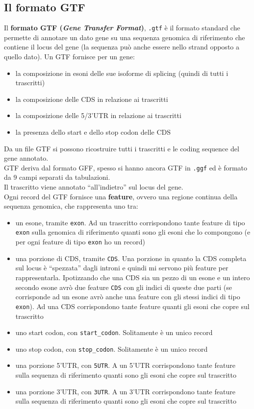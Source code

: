 \documentclass[a4paper,12pt, oneside]{book}
\begin{document}
\subsection{Il formato GTF}
Il \textbf{formato GTF (\textit{Gene Transfer Format})}, \texttt{.gtf} è il
formato standard che permette di 
annotare un dato gene su una sequenza genomica di riferimento che contiene il
locus del gene (la sequenza può anche essere nello strand opposto a quello
dato). Un GTF fornisce per un gene: 
\begin{itemize}
  \item la composizione in esoni delle sue isoforme di splicing (quindi di tutti
  i trascritti)
  \item la composizione delle CDS in relazione ai trascritti
  \item la composizione delle 5/3'UTR in relazione ai trascritti
  \item la presenza dello start e dello stop codon delle CDS
\end{itemize}
Da un file GTF si possono ricostruire tutti i trascritti e le coding sequence
del gene annotato. \\
GTF deriva dal formato GFF, spesso si hanno ancora GTF in \texttt{.ggf} ed è
formato da 9 campi separati da tabulazioni. \\
Il trascritto viene annotato ``all'indietro'' sul locus del gene.\\
Ogni record del GTF fornisce una \textbf{feature}, ovvero una regione continua
della sequenza genomica, che rappresenta uno tra:
\begin{itemize}
  \item un esone, tramite \texttt{exon}. Ad un trascritto corrispondono tante
  feature di tipo \texttt{exon} sulla genomica di riferimento quanti sono gli
  esoni che lo compongono (e per ogni feature di tipo \texttt{exon} ho un
  record) 
  \item una porzione di CDS, tramite \texttt{CDS}. Una porzione in quanto la CDS
  completa sul locus è ``spezzata'' dagli introni e quindi mi servono più
  feature per rappresentarla. Ipotizzando che una CDS sia un pezzo di un esone e
  un intero secondo esone avrò due feature \texttt{CDS} con gli indici di queste
  due parti (se corrisponde ad un esone avrò anche una feature con gli stessi
  indici di tipo \texttt{exon}). Ad una CDS corrispondono tante feature quanti
  gli esoni che copre sul trascritto
  \item uno start codon, con \texttt{start\_codon}. Solitamente è un unico
  record 
  \item uno stop codon, con \texttt{stop\_codon}. Solitamente è un unico record 
  \item una porzione 5'UTR, con \texttt{5UTR}. A un 5'UTR corrispondono tante
  feature sulla sequenza di riferimento quanti sono gli esoni che copre sul
  trascritto 
  \item una porzione 3'UTR, con \texttt{3UTR}. A un 3'UTR corrispondono tante
  feature sulla sequenza di riferimento quanti sono gli esoni che copre sul
  trascritto
\end{itemize}
\end{document}
